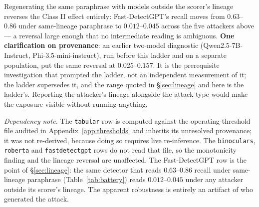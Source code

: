 \documentclass{article}
\begin{document}
\begin{table}[h]
\centering
\footnotesize
\caption{Recall@$1\%$FPR under paraphrase by attacker model. The first four
columns are the size-ordered Qwen2.5 sweep; Phi-3.5-mini is a cross-family
control and is not part of that ordering, so the pattern column describes the
Qwen sweep only. Source: \texttt{results/p4\_robustness.md} \S3.}
\label{tab:ladder}
\end{table}

Regenerating the same paraphrase with models outside the scorer's lineage
reverses the Class II effect entirely: Fast-DetectGPT's recall moves from
$0.63$--$0.86$ under same-lineage paraphrase to $0.012$--$0.045$ across the five
attackers above --- a reversal large enough that no intermediate reading is
ambiguous. \textbf{One clarification on provenance}: an earlier two-model
diagnostic (Qwen2.5-7B-Instruct, Phi-3.5-mini-instruct), run before this ladder
and on a separate population, put the same reversal at $0.025$--$0.157$. It is
the prerequisite investigation that prompted the ladder, not an independent
measurement of it; the ladder supersedes it, and the range quoted in
\S\ref{sec:lineage} and here is the ladder's. Reporting the attacker's lineage
alongside the attack type would make the exposure visible without running
anything.

\emph{Dependency note.} The \texttt{tabular} row is computed against the
operating-threshold file audited in Appendix~\ref{app:thresholds} and inherits
its unresolved provenance; it was not re-derived, because doing so requires live
re-inference. The \texttt{binoculars}, \texttt{roberta} and
\texttt{fastdetectgpt} rows do not read that file, so the monotonicity finding
and the lineage reversal are unaffected. The Fast-DetectGPT row is the point of
\S\ref{sec:lineage}: the same detector that reads $0.63$--$0.86$ recall under
same-lineage paraphrase (Table~\ref{tab:battery}) reads $0.012$--$0.045$ under
any attacker outside its scorer's lineage. The apparent robustness is entirely
an artifact of who generated the attack.
\end{document}
